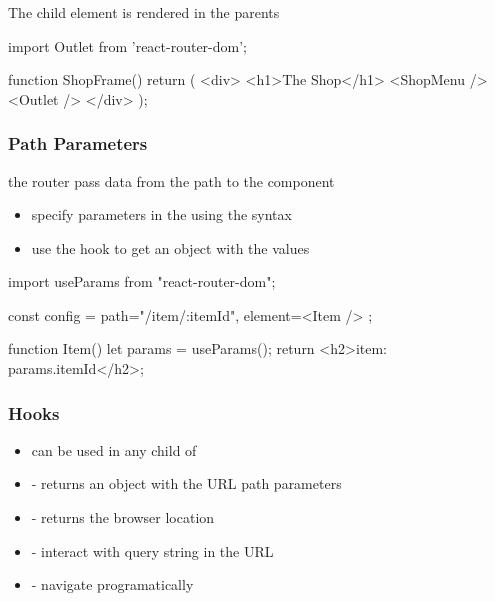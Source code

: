 \begin{frame}[fragile] \frametitle{}
The child element is rendered in the parents 

\vspace{5mm}
\begin{CodeBox}{}
import { Outlet } from 'react-router-dom';

function ShopFrame() {
  return (
    <div>
      <h1>The Shop</h1>
      <ShopMenu />
      <Outlet />
    </div>
  );
}
\end{CodeBox}
\end{frame}

\begin{frame}[fragile] \frametitle{Path Parameters}
the router pass data from the path to the component
\begin{itemize}
  \item specify parameters in the  using the syntax
  \item use the   hook to get an object with the values
\end{itemize}

\vspace{5mm}
\begin{CodeBox}{}
import { useParams } from "react-router-dom";

const config = {
    path="/item/:itemId", 
    element={<Item />}
};

function Item() {
  let params = useParams();
  return <h2>item: {params.itemId}</h2>;
}
\end{CodeBox}
\end{frame}

\begin{frame}[fragile] \frametitle{Hooks}
\begin{itemize}
  \item can be used in any child of 
  \item {} - returns an object with the URL path parameters
  \item {} - returns the browser location
  \item {} - interact with query string in the URL
  \item {} - navigate programatically
\end{itemize}
\end{frame}

